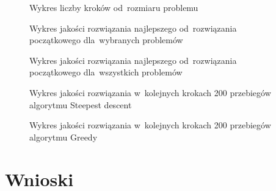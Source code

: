 \documentclass[a4paper,10pt]{article}
\begin{document}
\begin{figure}[h!]
\begin{center}

\caption{Wykres liczby kroków od~rozmiaru problemu}
\label{fig:stepssize}
\end{center}
\end{figure}

\begin{figure}
\begin{center}

\caption{Wykres jakości rozwiązania najlepszego od~rozwiązania początkowego dla~wybranych problemów}
\label{fig:initendquality}
\end{center}
\end{figure}

\begin{figure}[h!]
\begin{center}

\caption{Wykres jakości rozwiązania najlepszego od~rozwiązania początkowego dla~wszystkich problemów}
\label{fig:initendqualityall}
\end{center}
\end{figure}

\begin{figure}[h!]
\begin{center}

\caption{Wykres jakości rozwiązania w~kolejnych krokach 200 przebiegów algorytmu Steepest descent}
\label{fig:steephistkra30a}
\end{center}
\end{figure}

\begin{figure}[h!]
\begin{center}

\caption{Wykres jakości rozwiązania w~kolejnych krokach 200 przebiegów algorytmu Greedy}
\label{fig:greedyhistkra30a}
\end{center}
\end{figure}

\section{Wnioski}
\end{document}
